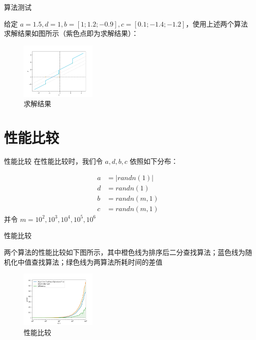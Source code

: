 \documentclass[aspectratio=169]{beamer}
\newcommand{\enableindent}{\setlength{\parskip}{6pt}\setlength{\parindent}{2em}}
\begin{document}
\begin{frame}[fragile]{算法测试}
    \enableindent

    给定 $a=1.5,d=1,b=[1;1.2;−0.9],c=[0.1;−1.4;−1.2]$，使用上述两个算法求解结果如图所示（紫色点即为求解结果）：

    \begin{figure}[htb]
        \centering
        \includegraphics[width=0.33\textwidth]{images/Answer.png}
        \caption{求解结果}
        \label{Answer}
    \end{figure}
\end{frame}

\section{性能比较}

\begin{frame}[fragile]{性能比较}
    在性能比较时，我们令 $a,d,b,c$ 依照如下分布：

    \begin{align}
        a & =|randn(1)|\nonumber  \\
        d & =randn(1)\nonumber    \\
        b & =randn(m, 1)\nonumber \\
        c & =randn(m, 1)\nonumber
    \end{align}
    并令 $m=10^2,10^3,10^4,10^5,10^6$
\end{frame}

\begin{frame}[fragile]{性能比较}
    \enableindent

    两个算法的性能比较如下图所示，其中橙色线为排序后二分查找算法；蓝色线为随机化中值查找算法；绿色线为两算法所耗时间的差值

    \begin{figure}[htb]
        \centering
        \includegraphics[width=0.33\textwidth]{images/Compare.png}
        \caption{性能比较}
        \label{Compare}
    \end{figure}
\end{frame}
\end{document}
